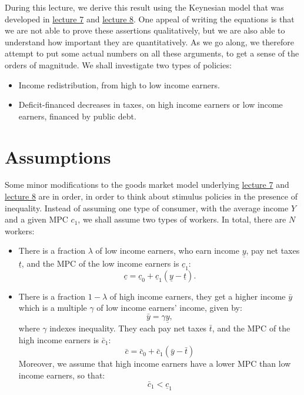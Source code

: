 \documentclass[]{book}
\theoremstyle{definition}
\theoremstyle{definition}
\theoremstyle{definition}
\theoremstyle{remark}
\begin{document}
During this lecture, we derive this result using the Keynesian model
that was developed in \href{lecture7.html}{lecture 7} and
\href{lecture8.html}{lecture 8}. One appeal of writing the equations is
that we are not able to prove these assertions qualitatively, but we are
also able to understand how important they are quantitatively. As we go
along, we therefore attempt to put some actual numbers on all these
arguments, to get a sense of the orders of magnitude. We shall
investigate two types of policies:

\begin{itemize}
\item
  Income redistribution, from high to low income earners.
\item
  Deficit-financed decreases in taxes, on high income earners or low
  income earners, financed by public debt.
\end{itemize}

\section{Assumptions}\label{assumptions-4}

Some minor modifications to the goods market model underlying
\href{lecture7.html}{lecture 7} and \href{lecture8.html}{lecture 8} are
in order, in order to think about stimulus policies in the presence of
inequality. Instead of assuming one type of consumer, with the average
income \(Y\) and a given MPC \(c_{1}\), we shall assume two types of
workers. In total, there are \(N\) workers:

\begin{itemize}
\item
  There is a fraction \(\lambda\) of low income earners, who earn income
  \(\underline{y}\), pay net taxes \(\underline{t}\), and the MPC of the
  low income earners is \(\underline{c}_{1}\):
  \[\underline{c}=\underline{c}_{0}+\underline{c}_{1}(\underline{y}-\underline{t}).\]
\item
  There is a fraction \(1-\lambda\) of high income earners, they get a
  higher income \(\bar{y}\) which is a multiple \(\gamma\) of low income
  earners' income, given by: \[\bar{y}=\gamma\underline{y},\] where
  \(\gamma\) indexes inequality. They each pay net taxes \(\bar{t}\),
  and the MPC of the high income earners is \(\bar{c}_{1}\):
  \[\bar{c}=\bar{c}_{0}+\bar{c}_{1}(\bar{y}-\bar{t})\] Moreover, we
  assume that high income earners have a lower MPC than low income
  earners, so that: \[\bar{c}_{1}<\underline{c}_{1}\]
\end{itemize}
\end{document}
